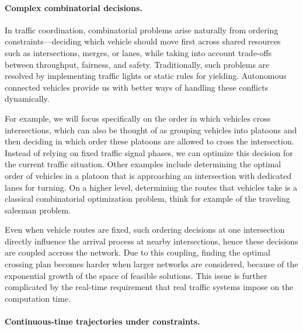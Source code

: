 \documentclass[a4paper]{report}
\theoremstyle{definition}
\theoremstyle{plain}
\begin{document}


\paragraph{Complex combinatorial decisions.}

In traffic coordination, combinatorial problems arise naturally from ordering
constraints---deciding which vehicle should move first across shared resources
such as intersections, merges, or lanes, while taking into account trade-offs
between throughput, fairness, and safety.
%
Traditionally, such problems are resolved by implementing traffic lights or
static rules for yielding.
%
Autonomous connected vehicles provide us with better ways of handling these
conflicts dynamically.

For example, we will focus specifically on the order in which vehicles cross
intersections, which can also be thought of as grouping vehicles into platoons
and then deciding in which order these platoons are allowed to cross the
intersection.
%
Instead of relying on fixed traffic signal phases, we can optimize this decision
for the current traffic situation.
%
Other examples include determining the optimal order of vehicles in a
platoon that is approaching an intersection with dedicated lanes for turning.
%
On a higher level, determining the routes that vehicles take is a classical
combinatorial optimization problem, think for example of the traveling salesman
problem.

Even when vehicle routes are fixed, such ordering decisions at one intersection
directly influence the arrival process at nearby intersections, hence these
decisions are coupled accross the network.
%
Due to this coupling, finding the optimal crossing plan becomes harder when
larger networks are considered, because of the exponential growth of the space
of feasible solutions.
%
This issue is further complicated by the real-time requirement that real traffic
systems impose on the computation time.

\paragraph{Continuous-time trajectories under constraints.}
\end{document}
